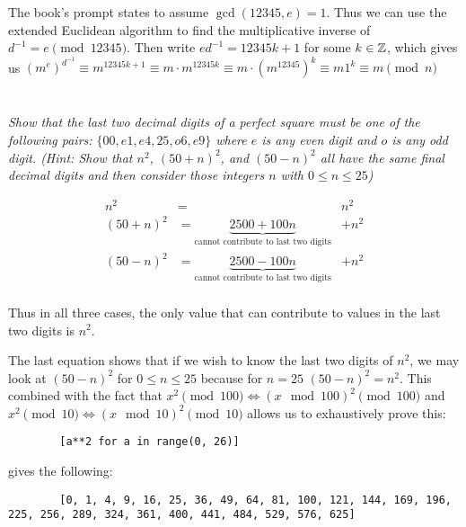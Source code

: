 \documentclass[12pt]{article}
\begin{document}
    The book's prompt states to assume $\gcd(12345, e) = 1$. Thus we can use the extended Euclidean algorithm to find the multiplicative inverse of $d^{-1} = e \pmod{12345}$. Then write $e d^{-1} = 12345k + 1$ for some $k \in \mathbb{Z}$, which gives us $(m^e)^{d^{-1}} \equiv m^{12345k + 1} \equiv m \cdot m^{12345k} \equiv m \cdot (m^{12345})^k \equiv m 1^k \equiv m \pmod{n}$

\section{}
    \subsection{} \textit{Show that the last two decimal digits of a perfect square must be one of the following pairs: $\{00, e1, e4, 25, o6, e9\}$ where $e$ is any even digit and $o$ is any odd digit. (Hint: Show that $n^2$, ${(50 + n)}^2$, and ${(50 - n)}^2$ all have the same final decimal digits and then consider those integers $n$ with $0 \leq n \leq 25$)}

    \begin{align*}
        n^2 &= &n^2\\
        (50 + n)^2 &= \underbrace{2500 + 100n}_{\text{cannot contribute to last two digits}} &+ n^2\\
        (50 - n)^2 &= \underbrace{2500 - 100n}_{\text{cannot contribute to last two digits}} &+ n^2\\
    \end{align*}

    Thus in all three cases, the only value that can contribute to values in the last two digits is $n^2$.

    The last equation shows that if we wish to know the last two digits of $n^2$, we may look at $(50 - n)^2$ for $0 \leq n \leq 25$ because for $n = 25$ $(50 - n)^2 = n^2$. This combined with the fact that $x^2 \pmod{100} \Longleftrightarrow (x \mod 100)^2 \pmod{100}$ and $x^2 \pmod{10} \Longleftrightarrow (x \mod 10)^2 \pmod{10}$ allows us to exhaustively prove this:

    \begin{verbatim}
        [a**2 for a in range(0, 26)]
    \end{verbatim}

    gives the following:

    \begin{verbatim}
        [0, 1, 4, 9, 16, 25, 36, 49, 64, 81, 100, 121, 144, 169, 196, 225, 256, 289, 324, 361, 400, 441, 484, 529, 576, 625]
    \end{verbatim}
\end{document}
